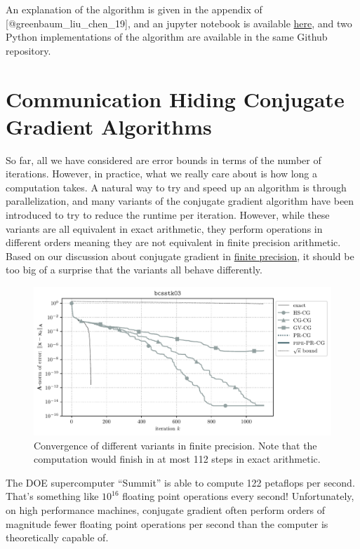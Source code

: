 \documentclass[10pt]{article}
\makeatletter
\def\maxwidth{\ifdim\Gin@nat@width>\linewidth\linewidth
\else\Gin@nat@width\fi}
\let\Oldincludegraphics\includegraphics
\renewcommand{\includegraphics}[1]{\Oldincludegraphics[width=\maxwidth]{#1}}
\makeatother
\begin{document}
An explanation of the algorithm is given in the appendix of {[}@greenbaum\_liu\_chen\_19{]}, and an jupyter notebook is available \href{https://github.com/tchen01/Conjugate_Gradient/blob/master/experiments/extend_t.ipynb}{here}, and two Python implementations of the algorithm are available in the same Github repository.

\section{Communication Hiding Conjugate Gradient Algorithms}

So far, all we have considered are error bounds in terms of the number of iterations.
However, in practice, what we really care about is how long a computation takes.
A natural way to try and speed up an algorithm is through parallelization, and many variants of the conjugate gradient algorithm have been introduced to try to reduce the runtime per iteration.
However, while these variants are all equivalent in exact arithmetic, they perform operations in different orders meaning they are not equivalent in finite precision arithmetic.
Based on our discussion about conjugate gradient in \href{./finite_precision_cg.html}{finite precision}, it should be too big of a surprise that the variants all behave differently.

\begin{figure}
\centering
\includegraphics{./imgs/convergence.pdf}
\caption{Convergence of different variants in finite precision. Note that the computation would finish in at most 112 steps in exact arithmetic.}
\end{figure}

The DOE supercomputer ``Summit'' is able to compute 122 petaflops per second.
That's something like \(10^{16}\) floating point operations every second!
Unfortunately, on high performance machines, conjugate gradient often perform orders of magnitude fewer floating point operations per second than the computer is theoretically capable of.
\end{document}
